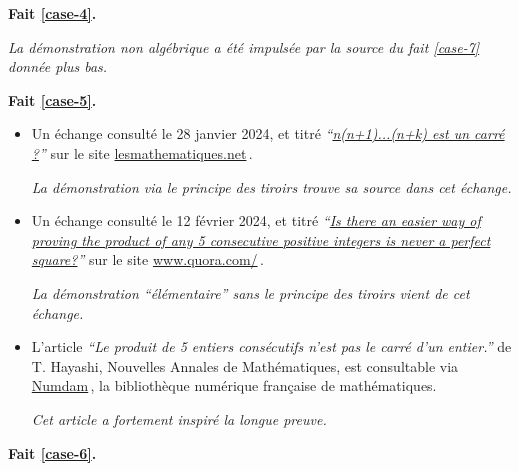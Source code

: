 

\bigskip
\textbf{Fait \ref{case-4}.}
	

\smallskip
\noindent
\emph{La démonstration non algébrique a été impulsée par la source du fait \ref{case-7} donnée plus bas.}




\bigskip
\textbf{Fait \ref{case-5}.}
	
\begin{itemize}
	\item Un échange consulté le 28 janvier 2024, et titré 
	\emph{\enquote{\href{https://les-mathematiques.net/vanilla/discussion/comment/351293}{n(n+1)...(n+k) est un carré ?}}} 
	sur le site \url{lesmathematiques.net}\,.

    \smallskip
    \noindent
    \emph{La démonstration via le principe des tiroirs trouve sa source dans cet échange.}


	\item Un échange consulté le 12 février 2024, et titré 
	\emph{\enquote{\href{https://artisticmathematics.quora.com/Is-there-an-easier-way-of-proving-the-product-of-any-5-consecutive-positive-integers-is-never-a-perfect-square}{Is there an easier way of proving the product of any 5 consecutive positive integers is never a perfect square?}}} 
	sur le site \url{www.quora.com/}\,.

    \smallskip
    \noindent
    \emph{La démonstration \enquote{élémentaire} sans le principe des tiroirs vient de cet échange.}


	\item L'article \emph{\enquote{Le produit de 5 entiers consécutifs n'est pas le carré d'un entier.}} de T. Hayashi, Nouvelles Annales de Mathématiques, est consultable via \href{https://numdam.org}{Numdam}\,, la bibliothèque numérique française de mathématiques.
	
	\smallskip
	\noindent
	\emph{Cet article a fortement inspiré la longue preuve.}
\end{itemize}
\vspace{-1ex}




\bigskip
\textbf{Fait \ref{case-6}.}
	
